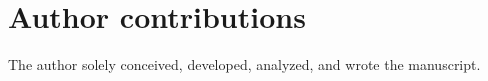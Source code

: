 \section*{Author contributions}
The author solely conceived, developed, analyzed, and wrote the manuscript.